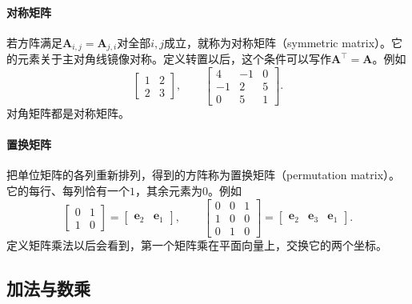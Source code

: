 \paragraph{对称矩阵}
若方阵满足$\bm A_{i,j}=\bm A_{j,i}$对全部$i,j$成立，就称为对称矩阵（symmetric matrix）。它的元素关于主对角线镜像对称。定义转置以后，这个条件可以写作$\bm A^\top=\bm A$。例如
\[
\begin{bmatrix}1&2\\2&3\end{bmatrix},\qquad
\begin{bmatrix}4&-1&0\\-1&2&5\\0&5&1\end{bmatrix}.
\]
对角矩阵都是对称矩阵。

\paragraph{置换矩阵}
把单位矩阵的各列重新排列，得到的方阵称为置换矩阵（permutation matrix）。它的每行、每列恰有一个$1$，其余元素为$0$。例如
\[
\begin{bmatrix}0&1\\1&0\end{bmatrix}=\begin{bmatrix}\bm e_2&\bm e_1\end{bmatrix},\qquad
\begin{bmatrix}0&0&1\\1&0&0\\0&1&0\end{bmatrix}=\begin{bmatrix}\bm e_2&\bm e_3&\bm e_1\end{bmatrix}.
\]
定义矩阵乘法以后会看到，第一个矩阵乘在平面向量上，交换它的两个坐标。

\subsection{加法与数乘}
\label{sec:ls-matrix-addition-scaling}

